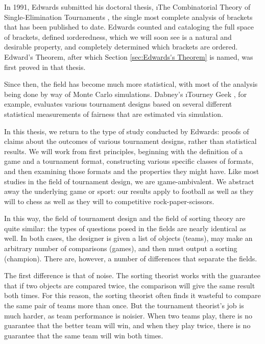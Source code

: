 {    In 1991, Edwards submitted his doctoral thesis, \i{The Combinatorial Theory of Single-Elimination Tournaments} \cite{montana}, the single most complete analysis of brackets that has been published to date. Edwards counted and cataloging the full space of brackets, defined \i{orderedness}, which we will soon see is a natural and desirable property, and completely determined which brackets are ordered. Edward's Theorem, after which Section \ref{sec:Edwards's Theorem} is named, was first proved in that thesis.

    Since then, the field has become much more statistical, with most of the analysis being done by way of Monte Carlo simulations. Dabney's \i{Tourney Geek} \cite{geek}, for example, evaluates various tournament designs based on several different statistical measurements of fairness that are estimated via simulation.
    
    In this thesis, we return to the type of study conducted by Edwards: proofs of claims about the outcomes of various tournament designs, rather than statistical results. We will work from first principles, beginning with the definition of a game and a tournament format, constructing various specific classes of formats, and then examining those formats and the properties they might have. Like most studies in the field of tournament design, we are \i{game-ambivalent}. We abstract away the underlying game or sport: our results apply to football as well as they will to chess as well as they will to competitive rock-paper-scissors.

    In this way, the field of tournament design and the field of sorting theory are quite similar: the types of questions posed in the fields are nearly identical as well. In both cases, the designer is given a list of objects (teams), may make an arbitrary number of comparisons (games), and then must output a sorting (champion). There are, however, a number of differences that separate the fields.

    The first difference is that of noise. The sorting theorist works with the guarantee that if two objects are compared twice, the comparison will give the same result both times. For this reason, the sorting theorist often finds it wasteful to compare the same pair of teams more than once. But the tournament theorist's job is much harder, as team performance is noisier. When two teams play, there is no guarantee that the better team will win, and when they play twice, there is no guarantee that the same team will win both times.

}
